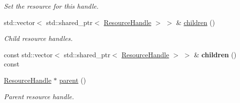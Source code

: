 \begin{Indent}
\begin{DoxyCompactItemize}
\begin{DoxyCompactList}\small\item\em Set the resource for this handle. \end{DoxyCompactList}\item 
\mbox{\label{classrev_1_1_resource_handle_a7f7fb370afcafc28f98b36375fc08499}} 
std\+::vector$<$ std\+::shared\+\_\+ptr$<$ \mbox{\hyperlink{classrev_1_1_resource_handle}{Resource\+Handle}} $>$ $>$ \& \mbox{\hyperlink{classrev_1_1_resource_handle_a7f7fb370afcafc28f98b36375fc08499}{children}} ()
\begin{DoxyCompactList}\small\item\em Child resource handles. \end{DoxyCompactList}\item 
\mbox{\label{classrev_1_1_resource_handle_a3a93baf897113fcf4e0045e2d49b9b66}} 
const std\+::vector$<$ std\+::shared\+\_\+ptr$<$ \mbox{\hyperlink{classrev_1_1_resource_handle}{Resource\+Handle}} $>$ $>$ \& {\bfseries children} () const
\item 
\mbox{\label{classrev_1_1_resource_handle_af2748a6225178f48c67b267eaf2362da}} 
\mbox{\hyperlink{classrev_1_1_resource_handle}{Resource\+Handle}} $\ast$ \mbox{\hyperlink{classrev_1_1_resource_handle_af2748a6225178f48c67b267eaf2362da}{parent}} ()
\begin{DoxyCompactList}\small\item\em Parent resource handle. \end{DoxyCompactList}\end{DoxyCompactItemize}
\end{Indent}

